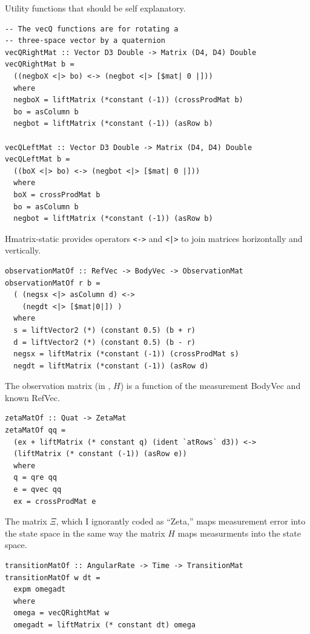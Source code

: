 \documentclass[12pt]{report}
\begin{document}
Utility functions that should be self explanatory.

\begin{lstlisting}
-- The vecQ functions are for rotating a 
-- three-space vector by a quaternion
vecQRightMat :: Vector D3 Double -> Matrix (D4, D4) Double
vecQRightMat b = 
  ((negboX <|> bo) <-> (negbot <|> [$mat| 0 |]))
  where 
  negboX = liftMatrix (*constant (-1)) (crossProdMat b)
  bo = asColumn b
  negbot = liftMatrix (*constant (-1)) (asRow b)

vecQLeftMat :: Vector D3 Double -> Matrix (D4, D4) Double
vecQLeftMat b = 
  ((boX <|> bo) <-> (negbot <|> [$mat| 0 |]))
  where 
  boX = crossProdMat b
  bo = asColumn b
  negbot = liftMatrix (*constant (-1)) (asRow b)
\end{lstlisting}

Hmatrix-static provides operators \lstinline$<->$ and \lstinline$<|>$ to join matrices horizontally and vertically.

\begin{lstlisting}
observationMatOf :: RefVec -> BodyVec -> ObservationMat
observationMatOf r b = 
  ( (negsx <|> asColumn d) <->
    (negdt <|> [$mat|0|]) )
  where 
  s = liftVector2 (*) (constant 0.5) (b + r)
  d = liftVector2 (*) (constant 0.5) (b - r)
  negsx = liftMatrix (*constant (-1)) (crossProdMat s)
  negdt = liftMatrix (*constant (-1)) (asRow d)
\end{lstlisting}

The observation matrix (in \cite{choukroun04}, $H$) is a function of the measurement BodyVec and known RefVec.

\begin{lstlisting}
zetaMatOf :: Quat -> ZetaMat
zetaMatOf qq = 
  (ex + liftMatrix (* constant q) (ident `atRows` d3)) <-> 
  (liftMatrix (* constant (-1)) (asRow e))
  where 
  q = qre qq
  e = qvec qq
  ex = crossProdMat e

\end{lstlisting}

The matrix $\Xi$, which I ignorantly coded as ``Zeta,'' maps measurement error into the state space in the same way the matrix $H$ maps measurments into the state space.

\begin{lstlisting}
transitionMatOf :: AngularRate -> Time -> TransitionMat
transitionMatOf w dt = 
  expm omegadt
  where 
  omega = vecQRightMat w
  omegadt = liftMatrix (* constant dt) omega

\end{lstlisting}
\end{document}
